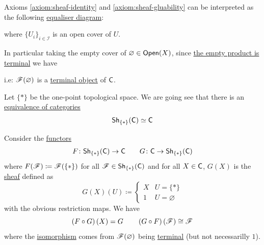 \documentclass[../../main]{subfiles}
\begin{document}
\begin{remark}\label{rem:sheaves-as-equalisers}
  Axioms \ref{axiom:sheaf-identity} and \ref{axiom:sheaf-gluability} can be interpreted as the following \hyperref[def:equaliser]{equaliser diagram}:
  \begin{center}
  \end{center}
  where \(\{U_{i}\}_{i \in \mathcal{I}}\) is an open cover of \(U\). 
  
  In particular taking the empty cover of \(\varnothing \in \mathsf{Open}(X)\), since \hyperref[rem:empty-product-is-terminal]{the empty product is terminal} we have
  \begin{center}
  \end{center}
  i.e: \(\mathscr{F}(\varnothing)\) is a \hyperref[def:initial-terminal-object]{terminal object} of \(\mathsf{C}\).
\end{remark}

\begin{example}\label{ex:one-point-sheaves-are-category}
  Let \(\{\ast\}\) be the one-point topological space.
  We are going see that there is an \hyperref[def:equivalent-categories]{equivalence of categories}
  \begin{equation*}
    \mathsf{Sh}_{\{\ast\}}(\mathsf{C}) \simeq \mathsf{C}
  \end{equation*}

  Consider the \hyperref[def:functor]{functors}
  \begin{align*}
    F\colon\mathsf{Sh}_{\{\ast\}}(\mathsf{C}) \to \mathsf{C} \qquad G\colon\mathsf{C} \to \mathsf{Sh}_{\{\ast\}}(\mathsf{C})
  \end{align*}
  where \(F(\mathscr{F}) \coloneq \mathscr{F}(\{\ast\})\) for all \(\mathscr{F} \in \mathsf{Sh}_{\{\ast\}}(\mathsf{C})\) and for all \(X \in \mathsf{C}\), \(G(X)\) is the \hyperref[def:sheaf]{sheaf} defined as
  \begin{equation*}
    G(X)(U) \coloneq \begin{cases}
      X & U = \{\ast\} \\
      1 & U = \varnothing
    \end{cases}
  \end{equation*}
  with the obvious restriction maps.
  We have
  \begin{equation*}
    \left( F \circ G \right)(X) = G \qquad \left( G \circ F \right)(\mathscr{F}) \cong \mathscr{F}
  \end{equation*}
  where the \hyperref[def:categorical-isomorphism]{isomorphism} comes from \(\mathscr{F}(\varnothing)\) being \hyperref[def:initial-terminal-object]{terminal} (but not necessarilly \(1\)).
\end{example}
\end{document}
